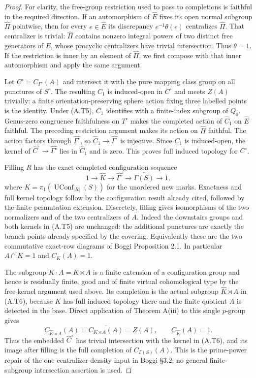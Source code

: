 \begin{proof}
For clarity, the free-group restriction used to pass to completions
is faithful in the required direction.  If an automorphism of
$\widehat E$ fixes its open normal subgroup $\widehat\Pi$
pointwise, then for every $e\in\widehat E$ its discrepancy
$e^{-1}\theta(e)$ centralizes $\widehat\Pi$.  That centralizer is
trivial: $\widehat\Pi$ contains nonzero integral powers of two
distinct free generators of $E$, whose procyclic centralizers have
trivial intersection.  Thus $\theta=1$.  If the restriction is
inner by an element of $\widehat\Pi$, we first compose with that
inner automorphism and apply the same argument.

Let $C^\circ=C_{\Gamma^\circ}(A)$ and intersect it with the pure
mapping class group on all punctures of $S^\circ$.  The resulting
$C_1$ is induced-open in $C^\circ$ and meets $Z(A)$ trivially:
a finite orientation-preserving sphere action fixing three labelled
points is the identity.  Under (A.T5), $C_1$ identifies with a
finite-index subgroup of $Q_0$.  Genus-zero congruence faithfulness
on $T^\circ$ makes the completed action of $\widehat C_1$ on
$\widehat E$ faithful.  The preceding restriction argument makes
its action on $\widehat\Pi$ faithful.  The action factors through
$\widehat{\Gamma^\circ}$, so
$\widehat C_1\to\widehat{\Gamma^\circ}$ is injective.  Since
$C_1$ is induced-open, the kernel of
$\widehat C^\circ\to\widehat{\Gamma^\circ}$ lies in
$\widehat C_1$ and is zero.  This proves full induced topology for
$C^\circ$.

Filling $R$ has the exact completed configuration sequence
\[
 1\longrightarrow\widehat K\longrightarrow
 \widehat{\Gamma^\circ}\longrightarrow\widehat{\Gamma(S)}
 \longrightarrow1,                                      \tag{A.T6}
\]
where $K=\pi_1(\operatorname{UConf}_{|R|}(S))$ for the unordered
new marks.  Exactness and full kernel topology follow by the
configuration result already cited, followed by the finite
permutation extension.  Discretely, filling gives isomorphisms
of the two normalizers and of the two centralizers of $A$.
Indeed the downstairs groups and both kernels in (A.T5) are
unchanged: the additional punctures are exactly the branch points
already specified by the covering.  Equivalently these are the two
commutative exact-row diagrams of Boggi Proposition 2.1.  In
particular $A\cap K=1$ and $C_K(A)=1$.

The subgroup $K\cdot A=K\rtimes A$ is a finite extension of a
configuration group and hence is residually finite, good and of
finite virtual cohomological type by the free-kernel argument used
above.  Its completion is the actual subgroup
$\widehat K\rtimes A$ in (A.T6), because $K$ has full induced
topology there and the finite quotient $A$ is detected in the base.
Direct application of Theorem A(iii) to this single $p$-group gives
\[
 C_{\widehat K\rtimes A}(A)
   =\overline{C_{K\rtimes A}(A)}=Z(A),\qquad
 C_{\widehat K}(A)=1.                                    \tag{A.T7}
\]
Thus the embedded $\widehat C^\circ$ has trivial intersection with
the kernel in (A.T6), and its image after filling is the full
completion of $C_{\Gamma(S)}(A)$.  This is the prime-power repair
of the one centralizer-density input in Boggi \S3.2; no general
finite-subgroup intersection assertion is used.


\end{proof}
